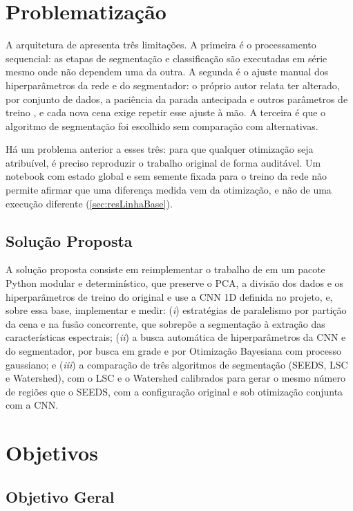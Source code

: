 \section{Problematização}
\label{sec:problematizacao}

A arquitetura de  apresenta três limitações. A primeira é o processamento sequencial: as etapas de segmentação e classificação são executadas em série mesmo onde não dependem uma da outra. A segunda é o ajuste manual dos hiperparâmetros da rede e do segmentador: o próprio autor relata ter alterado, por conjunto de dados, a paciência da parada antecipada e outros parâmetros de treino \cite{Souza2023}, e cada nova cena exige repetir esse ajuste à mão. A terceira é que o algoritmo de segmentação foi escolhido sem comparação com alternativas.

Há um problema anterior a esses três: para que qualquer otimização seja atribuível, é preciso reproduzir o trabalho original de forma auditável. Um notebook com estado global e sem semente fixada para o treino da rede não permite afirmar que uma diferença medida vem da otimização, e não de uma execução diferente (\autoref{sec:resLinhaBase}).

\subsection{Solução Proposta}
\label{subsec:solucao}

A solução proposta consiste em reimplementar o trabalho de  em um pacote Python modular e determinístico, que preserve o PCA, a divisão dos dados e os hiperparâmetros de treino do original e use a CNN 1D definida no projeto, e, sobre essa base, implementar e medir: (\textit{i}) estratégias de paralelismo por partição da cena e na fusão concorrente, que sobrepõe a segmentação à extração das características espectrais; (\textit{ii}) a busca automática de hiperparâmetros da CNN e do segmentador, por busca em grade e por Otimização Bayesiana com processo gaussiano; e (\textit{iii}) a comparação de três algoritmos de segmentação (SEEDS, LSC e Watershed), com o LSC e o Watershed calibrados para gerar o mesmo número de regiões que o SEEDS, com a configuração original e sob otimização conjunta com a CNN.

\section{Objetivos}

\subsection{Objetivo Geral}

